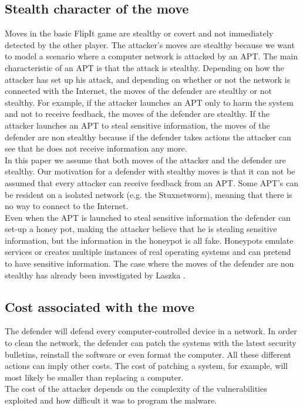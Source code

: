 \subsection{Stealth character of the move}
Moves in the basic FlipIt game are stealthy or covert and not immediately detected by the other player. The attacker's moves are stealthy because we want to model a scenario where a computer network is attacked by an APT. The main characteristic of an APT is that the attack is stealthy. Depending on how the attacker has set up his attack, and depending on whether or not the network is connected with the Internet, the moves of the defender are stealthy or not stealthy. For example, if the attacker launches an APT only to harm the system and not to receive feedback, the moves of the defender are stealthy. If the attacker launches an APT to steal sensitive information, the moves of the defender are non stealthy because if the defender takes actions the attacker can see that he does not receive information any more. \\
In this paper we assume that both moves of the attacker and the defender are stealthy. Our motivation for a defender with stealthy moves is that it can not be assumed that every attacker can receive feedback from an APT. Some APT's can be resident on a isolated network (e.g. the Stuxnetworm), meaning that there is no way to connect to the Internet. \\
Even when the APT is launched to steal sensitive information the defender can set-up a honey pot, making the attacker believe that he is stealing sensitive information, but the information in the honeypot is all fake. Honeypots emulate services or creates multiple instances of real operating systems and can pretend to have sensitive information.  The case where the moves of the defender are non stealthy has already been investigated by Laszka \citep{MitigationNonTargeted}.


  
\subsection{Cost associated with the move}
 The defender will defend every computer-controlled device in a network. In order to clean the network, the defender can patch the systems with the latest security bulletins, reinstall the software or even format the computer. All these different actions can imply other costs. The cost of patching a system, for example, will most likely be smaller than replacing a computer. \\ 
The cost of the attacker depends on the complexity of the vulnerabilities exploited and how difficult it was to program the malware.
